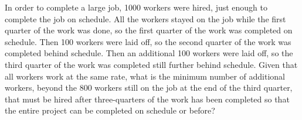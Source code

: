 In order to complete a large job, 1000 workers were hired, just enough to complete the job on schedule. All the workers stayed on the job while the first quarter of the work was done, so the first quarter of the work was completed on schedule. Then 100 workers were laid off, so the second quarter of the work was completed behind schedule. Then an additional 100 workers were laid off, so the third quarter of the work was completed still further behind schedule. Given that all workers work at the same rate, what is the minimum number of additional workers, beyond the 800 workers still on the job at the end of the third quarter, that must be hired after three-quarters of the work has been completed so that the entire project can be completed on schedule or before?
